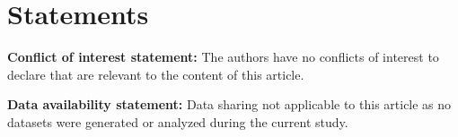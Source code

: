 \documentclass[a4paper,11pt]{amsart}
\theoremstyle{definition}
\numberwithin{equation}{section}
\theoremstyle{definition}
\begin{document}
\section{\bf Statements}

\textbf{Conflict of interest statement:} The authors have no conflicts of interest to declare that are relevant
to the content of this article.

\textbf{Data availability statement:} Data sharing not applicable to this article as no datasets were generated
or analyzed during the current study.


%
%




\end{document}
